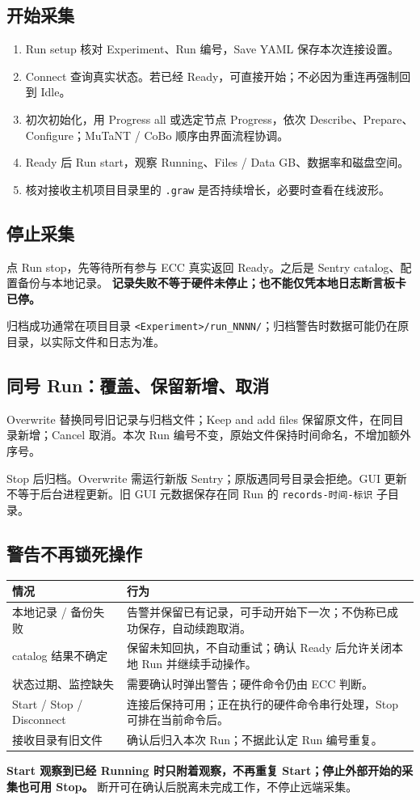 \documentclass[11pt,a4paper]{article}
\newcommand{\code}[1]{\texttt{#1}}
\begin{document}
\subsection*{开始采集}
\begin{enumerate}
\item Run setup 核对 Experiment、Run 编号，Save YAML 保存本次连接设置。
\item Connect 查询真实状态。若已经 Ready，可直接开始；不必因为重连再强制回到 Idle。
\item 初次初始化，用 Progress all 或选定节点 Progress，依次 Describe、Prepare、Configure；MuTaNT / CoBo 顺序由界面流程协调。
\item Ready 后 Run start，观察 Running、Files / Data GB、数据率和磁盘空间。
\item 核对接收主机项目目录里的 \code{.graw} 是否持续增长，必要时查看在线波形。
\end{enumerate}
\subsection*{停止采集}
点 Run stop，先等待所有参与 ECC 真实返回 Ready。之后是 Sentry catalog、配置备份与本地记录。
\textbf{记录失败不等于硬件未停止；也不能仅凭本地日志断言板卡已停。}\par
归档成功通常在项目目录 \code{<Experiment>/run\_NNNN/}；归档警告时数据可能仍在原目录，以实际文件和日志为准。
\subsection*{同号 Run：覆盖、保留新增、取消}
Overwrite 替换同号旧记录与归档文件；Keep and add files 保留原文件，在同目录新增；Cancel 取消。本次 Run 编号不变，原始文件保持时间命名，不增加额外序号。\par
Stop 后归档。Overwrite 需运行新版 Sentry；原版遇同号目录会拒绝。GUI 更新不等于后台进程更新。旧 GUI 元数据保存在同 Run 的 \code{records-时间-标识} 子目录。
\subsection*{警告不再锁死操作}
\par\smallskip\noindent\begin{tabularx}{\linewidth}{@{}L{40mm}Y@{}}\toprule
情况 & 行为 \\\midrule
本地记录 / 备份失败 & 告警并保留已有记录，可手动开始下一次；不伪称已成功保存，自动续跑取消。\\
catalog 结果不确定 & 保留未知回执，不自动重试；确认 Ready 后允许关闭本地 Run 并继续手动操作。\\
状态过期、监控缺失 & 需要确认时弹出警告；硬件命令仍由 ECC 判断。\\
Start / Stop / Disconnect & 连接后保持可用；正在执行的硬件命令串行处理，Stop 可排在当前命令后。\\
接收目录有旧文件 & 确认后归入本次 Run；不据此认定 Run 编号重复。\\\bottomrule
\end{tabularx}\par\smallskip
\textbf{Start 观察到已经 Running 时只附着观察，不再重复 Start；停止外部开始的采集也可用 Stop。}
断开可在确认后脱离未完成工作，不停止远端采集。
\end{document}
